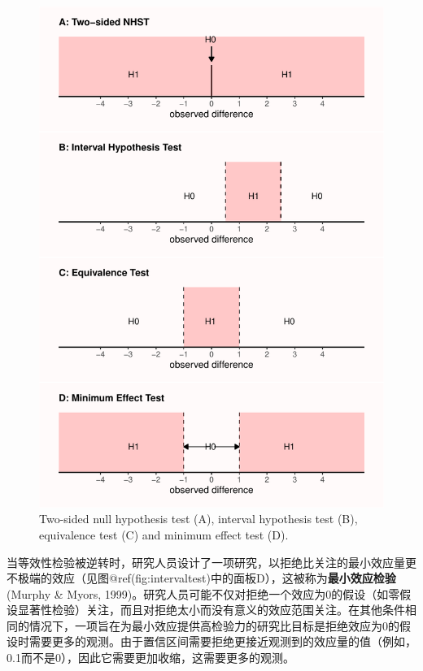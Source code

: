 \documentclass[
  letterpaper,
  DIV=11,
  numbers=noendperiod]{scrreprt}
\begin{document}
\begin{figure}

{\centering \includegraphics[width=1\textwidth,height=\textheight]{09-equivalencetest_files/figure-pdf/fig-intervaltest-1.pdf}

}

\caption{\label{fig-intervaltest}Two-sided null hypothesis test (A),
interval hypothesis test (B), equivalence test (C) and minimum effect
test (D).}

\end{figure}

当等效性检验被逆转时，研究人员设计了一项研究，以拒绝比关注的最小效应量更不极端的效应（见图@ref(fig:intervaltest)中的面板D），这被称为\textbf{最小效应检验}(Murphy
\& Myors,
1999)。研究人员可能不仅对拒绝一个效应为0的假设（如零假设显著性检验）关注，而且对拒绝太小而没有意义的效应范围关注。在其他条件相同的情况下，一项旨在为最小效应提供高检验力的研究比目标是拒绝效应为0的假设时需要更多的观测。由于置信区间需要拒绝更接近观测到的效应量的值（例如，0.1而不是0），因此它需要更加收缩，这需要更多的观测。
\end{document}

